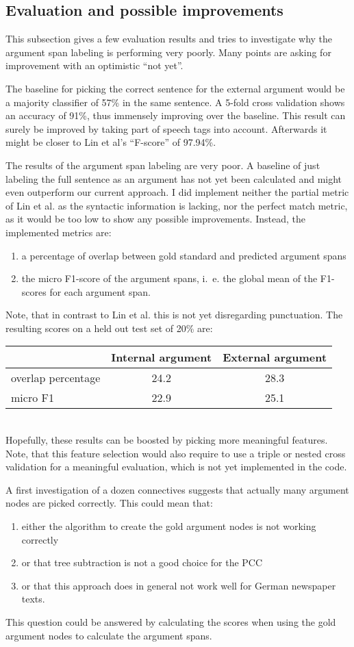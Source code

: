 \documentclass[10pt,a4paper]{article}
\begin{document}
\subsection{Evaluation and possible improvements}
This subsection gives a few evaluation results and tries to investigate why the argument span labeling is performing very poorly. Many points are asking for improvement with an optimistic ``not yet''.

The baseline for picking the correct sentence for the external argument would be a majority classifier of 57\% in the same sentence.
A 5-fold cross validation shows an accuracy of 91\%, thus immensely improving over the baseline. This result can surely be improved by taking part of speech tags into account. Afterwards it might be closer to Lin et al's ``F-score'' of 97.94\%.

The results of the argument span labeling are very poor. A baseline of just labeling the full sentence as an argument has not yet been calculated and might even outperform our current approach. I did implement neither the partial metric of Lin et al. as the syntactic information is lacking, nor the perfect match metric, as it would be too low to show any possible improvements. Instead, the implemented metrics are:
\begin{enumerate}
\item a percentage of overlap between gold standard and predicted argument spans
\item the micro F1-score of the argument spans, i.~e. the global mean of the F1-scores for each argument span.
\end{enumerate}
Note, that in contrast to Lin et al. this is not yet disregarding punctuation.
The resulting scores on a held out test set of 20\% are:\\
\begin{tabular}{l || c | c}
   & Internal argument  & External argument \\
   \hline
   \hline
 overlap percentage  & 24.2  & 28.3 \\
   \hline
 micro F1  & 22.9  & 25.1 \\
\end{tabular}\\
Hopefully, these results can be boosted by picking more meaningful features. Note, that this feature selection would also require to use a triple or nested cross validation for a meaningful evaluation, which is not yet implemented in the code.

A first investigation of a dozen connectives suggests that actually many argument nodes are picked correctly. This could mean that:
\begin{enumerate}
\item either the algorithm to create the gold argument nodes is not working correctly
\item or that tree subtraction is not a good choice for the PCC
\item or that this approach does in general not work well for German newspaper texts.
\end{enumerate}
This question could be answered by calculating the scores when using the gold argument nodes to calculate the argument spans.
\end{document}
